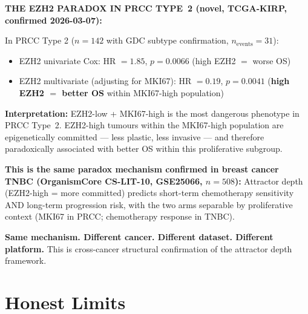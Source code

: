 \documentclass[11pt, a4paper]{article}
\begin{document}
\begin{mdframed}[backgroundcolor=mechbox,
                 linecolor=green!40!black,
                 linewidth=1pt]
\textbf{THE EZH2 PARADOX IN PRCC TYPE~2
(novel, TCGA-KIRP, confirmed 2026-03-07):}

\medskip
In PRCC Type 2 ($n = 142$ with GDC subtype
confirmation, $n_\text{events} = 31$):

\begin{itemize}[noitemsep]
    \item EZH2 univariate Cox:
    HR $= 1.85$, $p = 0.0066$
    (high EZH2 $=$ worse OS)
    \item EZH2 multivariate (adjusting
    for MKI67): HR $= 0.19$,
    $p = 0.0041$
    (\textbf{high EZH2 $=$ better OS}
    within MKI67-high population)
\end{itemize}

\medskip
\textbf{Interpretation:} EZH2-low +
MKI67-high is the most dangerous
phenotype in PRCC Type~2. EZH2-high
tumours within the MKI67-high population
are epigenetically committed --- less
plastic, less invasive --- and therefore
paradoxically associated with better OS
within this proliferative subgroup.

\medskip
\textbf{This is the same paradox mechanism
confirmed in breast cancer TNBC
(OrganismCore CS-LIT-10, GSE25066,
$n = 508$):}
Attractor depth (EZH2-high = more
committed) predicts short-term
chemotherapy sensitivity AND long-term
progression risk, with the two arms
separable by proliferative context
(MKI67 in PRCC; chemotherapy response
in TNBC).

\medskip
\textbf{Same mechanism. Different cancer.
Different dataset. Different platform.}
This is cross-cancer structural
confirmation of the attractor depth
framework.
\end{mdframed}

\section{Honest Limits}
\label{sec:limits}
\end{document}

